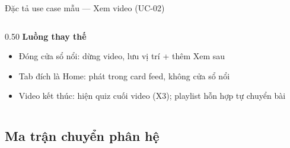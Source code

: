 \begin{frame}{Đặc tả use case mẫu --- Xem video (UC-02)}
\begin{columns}[T]
\begin{column}{0.50\textwidth}
{\small\textbf{Luồng thay thế}}\\[0.8mm]
{\scriptsize
\begin{itemize}\setlength{\itemsep}{0.8pt}
\item Đóng cửa sổ nổi: dừng video, lưu vị trí + thêm Xem sau
\item Tab đích là Home: phát trong card feed, không cửa sổ nổi
\item Video kết thúc: hiện quiz cuối video (X3); playlist hỗn hợp tự chuyển bài
\end{itemize}}
\end{column}
\end{columns}
\end{frame}

\subsection{Ma trận chuyển phân hệ}
